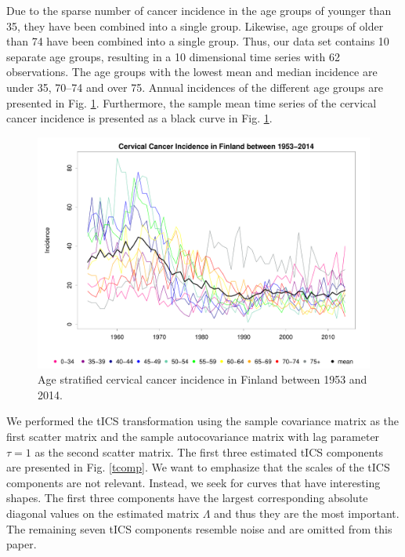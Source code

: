 \documentclass{llncs}
\begin{document}
Due to the sparse number of cancer incidence in the age groups of younger than 35,  they have been combined  into a single group. Likewise, age groups of older than 74 have been combined into a single group. Thus, our data set contains 10 separate age groups, resulting in a 10 dimensional time series with 62 observations. The age groups with the lowest mean and median incidence are under 35, 70--74 and over 75. Annual incidences of the different age groups  are  presented in Fig. \ref{p1b}. Furthermore, the sample mean time series of the cervical cancer incidence is presented as a black curve in Fig. \ref{p1b}.
\begin{figure}
   \centering
\includegraphics[width=0.722\linewidth]{cervicaloriginal.pdf}
\caption{Age stratified cervical cancer incidence in Finland between 1953 and 2014.}
\label{p1b}
\end{figure}

We performed the tICS transformation using the sample covariance matrix as the first scatter matrix and the sample autocovariance matrix with lag parameter $\tau=1$ as the second scatter matrix. 
The first three estimated tICS components are presented in Fig. \ref{tcomp}. We want to emphasize that the scales of the tICS components are not relevant. Instead, we seek for curves that have interesting shapes. The first three components have the largest corresponding absolute diagonal values on the estimated matrix $\Lambda$ and thus they are the most important. The remaining seven tICS components resemble noise and are omitted from this paper.

 
 
\end{document}
